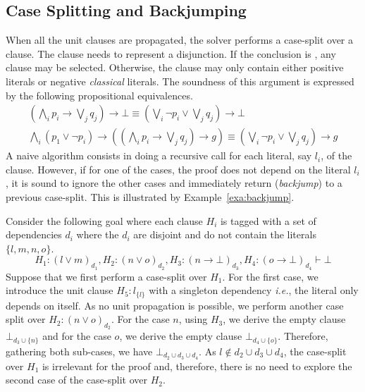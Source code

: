 \documentclass[utf8,a4paper,UKenglish,cleveref, autoref, thm-restate]{lipics-v2019}
\begin{document}
\subsection{Case Splitting and Backjumping}
\label{sec:case-split}

When all the unit clauses are propagated, the solver performs a
case-split over a clause. The clause needs to represent a
disjunction. If the conclusion is , any clause may be
selected. Otherwise, the clause may only contain  either positive literals or  negative
\emph{classical} literals. The soundness of this argument is expressed by
the following propositional equivalences.
\[
  \begin{array}{l}
  (\bigwedge_i p_i \to \bigvee_j q_j) \to \bot \equiv (\bigvee_i \neg p_i \lor \bigvee_j q_j) \to \bot\\
    \bigwedge_i (p_1 \lor \neg p_i) \to ((\bigwedge_i p_i \to \bigvee_j q_j) \to g) \equiv (\bigvee_i \neg p_i \lor \bigvee_j q_j) \to g
  \end{array}
\]
A naive algorithm consists in doing a recursive call for each literal,
say $l_i$, of the clause.  However, if for one of the cases, the proof
does not depend on the literal $l_i$, it is sound to ignore the other
cases and immediately return (\emph{backjump}) to a previous
case-split. This is illustrated by Example~\ref{exa:backjump}.
\begin{example}[Backjumping]
  \label{exa:backjump}
  Consider the following goal where each clause $H_i$ is tagged with a
  set of dependencies $d_i$ where the $d_i$ are disjoint and do not
  contain the literals $\{l,m,n,o\}$.
  \[
    H_1 : (l \lor m)_{d_1}, 
    H_2 : (n \lor o)_{d_2},
    H_3 : (n \to \bot)_{d_3},
    H_4 : (o \to \bot)_{d_4}
    \vdash \bot
\]
Suppose that we first perform a case-split over $H_1$.  For the first
case, we introduce the unit clause $H_5:l_{\{l\}}$ with a singleton
dependency \emph{i.e.}, the literal only depends on itself. As no unit
propagation is possible, we perform another case split over $H_2: (n \lor o)_{d_2}$.
For the case $n$, using $H_3$, we derive the empty clause
$\bot_{d_3 \cup \{n\}}$ and for the case $o$, we derive the empty
clause $\bot_{d_4 \cup \{o\}}$. Therefore, gathering both sub-cases,
we have $\bot_{d_2 \cup d_3 \cup d_4}$.  As
$l \notin d_2 \cup d_3 \cup d_4$, the case-split over $H_1$ is
irrelevant for the proof and, therefore, there is no need to explore
the second case of the case-split over $H_2$.
\end{example}
\end{document}
